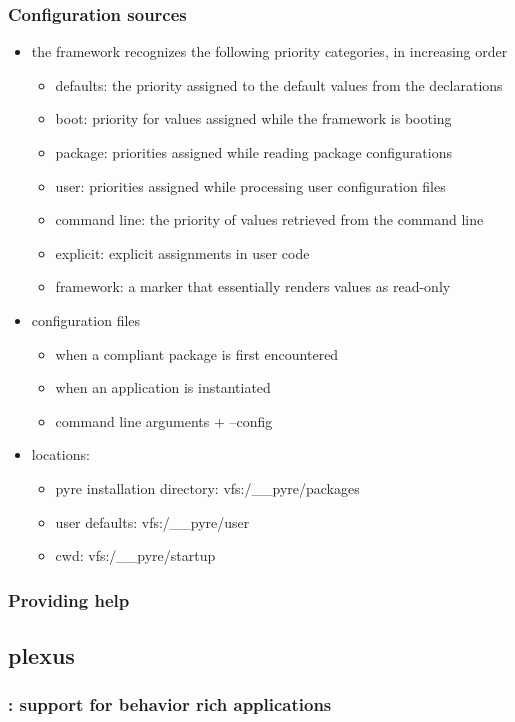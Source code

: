 \begin{frame}
%
  \frametitle{Configuration sources}
%
  \begin{itemize}
%
  \item the framework recognizes the following priority categories, in increasing order
    \begin{itemize}
    \item defaults: the priority assigned to the default values from the declarations
    \item boot: priority for values assigned while the framework is booting
    \item package: priorities assigned while reading package configurations
    \item user: priorities assigned while processing user configuration files
    \item command line: the priority of values retrieved from the command line
    \item explicit: explicit assignments in user code
    \item framework: a marker that essentially renders values as read-only
    \end{itemize}
%
  \item configuration files
    \begin{itemize}
    \item when a compliant package is first encountered
    \item when an application is instantiated
    \item command line arguments + --config
    \end{itemize}
%
  \item locations:
    \begin{itemize}
    \item pyre installation directory: vfs:/\_\_pyre/packages
    \item user defaults: vfs:/\_\_pyre/user
    \item cwd: vfs:/\_\_pyre/startup
    \end{itemize}
%
  \end{itemize}
%
\end{frame}

\begin{frame}
%
  \frametitle{Providing help}
%
\end{frame}

\subsection{plexus}
\begin{frame}
%
  \frametitle{: support for behavior rich applications}
%
\end{frame}

